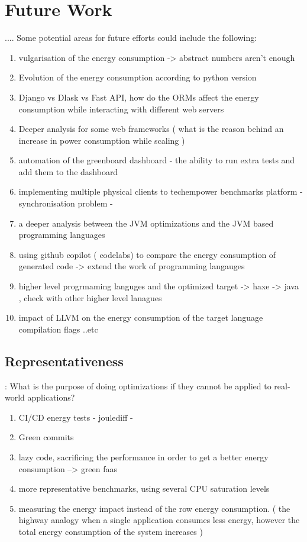 \section{Future Work}
.... Some potential areas for future efforts could include the following:

\begin{enumerate}
      \item  vulgarisation of the energy consumption -> abstract numbers aren't enough 
      \item  Evolution of the energy consumption according to python version 
      \item Django vs Dlask vs Fast API, how do the ORMs affect the energy consumption while interacting with different web servers
      \item Deeper analysis for some web frameworks ( what is the reason behind an increase in power consumption while scaling ) 
      \item automation of the greenboard dashboard - the ability to run extra tests and add them to the dashboard 
      \item implementing multiple physical clients to techempower benchmarks platform - synchronisation problem - 
      \item a deeper analysis between the JVM optimizations and the JVM based programming languages 
      \item using github copilot ( codelabs) to compare the energy consumption of generated code -> extend the work of programming langauges 
      \item higher level progrmaming languges and the optimized target -> haxe -> java , check with other higher level lanagues 
      \item impact of LLVM on the energy consumption of the target language  compilation flags ..etc 

\end{enumerate}


\subsection*{Representativeness} : 
What is the purpose of doing optimizations if they cannot be applied to real-world applications? 
\begin{enumerate}
      \item CI/CD energy tests  - joulediff - 
      \item Green commits 
      \item lazy code, sacrificing the performance in order to get a better energy consumption --> green faas 
      \item more representative benchmarks, using several CPU saturation levels 
      \item measuring the energy impact instead of the row energy consumption. ( the highway analogy when a single application consumes less energy, however the total energy consumption of the system increases )
\end{enumerate}
\vfill \strut  %
\cleardoublepage
